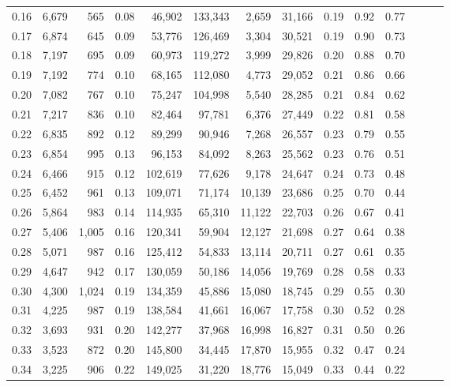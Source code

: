 \begin{tabular}{rrrrrrrrrrrrrr}
0.16 &  6,679 &    565 &  0.08 &   46,902 &  133,343 &   2,659 &  31,166 &  0.19 &  0.92 &      0.77 \\
0.17 &  6,874 &    645 &  0.09 &   53,776 &  126,469 &   3,304 &  30,521 &  0.19 &  0.90 &      0.73 \\
0.18 &  7,197 &    695 &  0.09 &   60,973 &  119,272 &   3,999 &  29,826 &  0.20 &  0.88 &      0.70 \\
0.19 &  7,192 &    774 &  0.10 &   68,165 &  112,080 &   4,773 &  29,052 &  0.21 &  0.86 &      0.66 \\
0.20 &  7,082 &    767 &  0.10 &   75,247 &  104,998 &   5,540 &  28,285 &  0.21 &  0.84 &      0.62 \\
0.21 &  7,217 &    836 &  0.10 &   82,464 &   97,781 &   6,376 &  27,449 &  0.22 &  0.81 &      0.58 \\
0.22 &  6,835 &    892 &  0.12 &   89,299 &   90,946 &   7,268 &  26,557 &  0.23 &  0.79 &      0.55 \\
0.23 &  6,854 &    995 &  0.13 &   96,153 &   84,092 &   8,263 &  25,562 &  0.23 &  0.76 &      0.51 \\
0.24 &  6,466 &    915 &  0.12 &  102,619 &   77,626 &   9,178 &  24,647 &  0.24 &  0.73 &      0.48 \\
0.25 &  6,452 &    961 &  0.13 &  109,071 &   71,174 &  10,139 &  23,686 &  0.25 &  0.70 &      0.44 \\
0.26 &  5,864 &    983 &  0.14 &  114,935 &   65,310 &  11,122 &  22,703 &  0.26 &  0.67 &      0.41 \\
0.27 &  5,406 &  1,005 &  0.16 &  120,341 &   59,904 &  12,127 &  21,698 &  0.27 &  0.64 &      0.38 \\
0.28 &  5,071 &    987 &  0.16 &  125,412 &   54,833 &  13,114 &  20,711 &  0.27 &  0.61 &      0.35 \\
0.29 &  4,647 &    942 &  0.17 &  130,059 &   50,186 &  14,056 &  19,769 &  0.28 &  0.58 &      0.33 \\
0.30 &  4,300 &  1,024 &  0.19 &  134,359 &   45,886 &  15,080 &  18,745 &  0.29 &  0.55 &      0.30 \\
0.31 &  4,225 &    987 &  0.19 &  138,584 &   41,661 &  16,067 &  17,758 &  0.30 &  0.52 &      0.28 \\
0.32 &  3,693 &    931 &  0.20 &  142,277 &   37,968 &  16,998 &  16,827 &  0.31 &  0.50 &      0.26 \\
0.33 &  3,523 &    872 &  0.20 &  145,800 &   34,445 &  17,870 &  15,955 &  0.32 &  0.47 &      0.24 \\
0.34 &  3,225 &    906 &  0.22 &  149,025 &   31,220 &  18,776 &  15,049 &  0.33 &  0.44 &      0.22 \\

\end{tabular}
